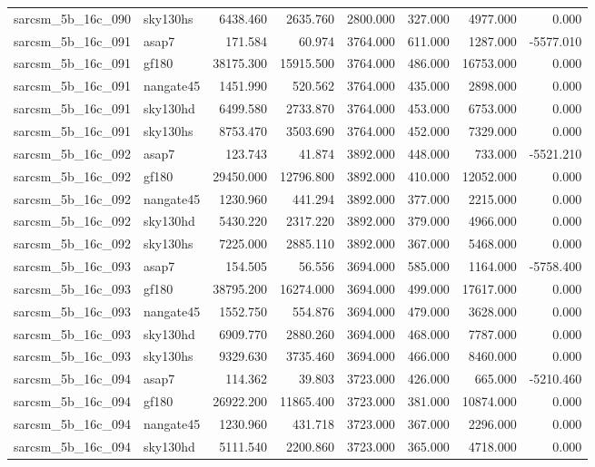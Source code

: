 \begin{tabular}{llrrrrrr}
sarcsm\_5b\_16c\_090 & sky130hs & 6438.460 & 2635.760 & 2800.000 & 327.000 & 4977.000 & 0.000 \\
sarcsm\_5b\_16c\_091 & asap7 & 171.584 & 60.974 & 3764.000 & 611.000 & 1287.000 & -5577.010 \\
sarcsm\_5b\_16c\_091 & gf180 & 38175.300 & 15915.500 & 3764.000 & 486.000 & 16753.000 & 0.000 \\
sarcsm\_5b\_16c\_091 & nangate45 & 1451.990 & 520.562 & 3764.000 & 435.000 & 2898.000 & 0.000 \\
sarcsm\_5b\_16c\_091 & sky130hd & 6499.580 & 2733.870 & 3764.000 & 453.000 & 6753.000 & 0.000 \\
sarcsm\_5b\_16c\_091 & sky130hs & 8753.470 & 3503.690 & 3764.000 & 452.000 & 7329.000 & 0.000 \\
sarcsm\_5b\_16c\_092 & asap7 & 123.743 & 41.874 & 3892.000 & 448.000 & 733.000 & -5521.210 \\
sarcsm\_5b\_16c\_092 & gf180 & 29450.000 & 12796.800 & 3892.000 & 410.000 & 12052.000 & 0.000 \\
sarcsm\_5b\_16c\_092 & nangate45 & 1230.960 & 441.294 & 3892.000 & 377.000 & 2215.000 & 0.000 \\
sarcsm\_5b\_16c\_092 & sky130hd & 5430.220 & 2317.220 & 3892.000 & 379.000 & 4966.000 & 0.000 \\
sarcsm\_5b\_16c\_092 & sky130hs & 7225.000 & 2885.110 & 3892.000 & 367.000 & 5468.000 & 0.000 \\
sarcsm\_5b\_16c\_093 & asap7 & 154.505 & 56.556 & 3694.000 & 585.000 & 1164.000 & -5758.400 \\
sarcsm\_5b\_16c\_093 & gf180 & 38795.200 & 16274.000 & 3694.000 & 499.000 & 17617.000 & 0.000 \\
sarcsm\_5b\_16c\_093 & nangate45 & 1552.750 & 554.876 & 3694.000 & 479.000 & 3628.000 & 0.000 \\
sarcsm\_5b\_16c\_093 & sky130hd & 6909.770 & 2880.260 & 3694.000 & 468.000 & 7787.000 & 0.000 \\
sarcsm\_5b\_16c\_093 & sky130hs & 9329.630 & 3735.460 & 3694.000 & 466.000 & 8460.000 & 0.000 \\
sarcsm\_5b\_16c\_094 & asap7 & 114.362 & 39.803 & 3723.000 & 426.000 & 665.000 & -5210.460 \\
sarcsm\_5b\_16c\_094 & gf180 & 26922.200 & 11865.400 & 3723.000 & 381.000 & 10874.000 & 0.000 \\
sarcsm\_5b\_16c\_094 & nangate45 & 1230.960 & 431.718 & 3723.000 & 367.000 & 2296.000 & 0.000 \\
sarcsm\_5b\_16c\_094 & sky130hd & 5111.540 & 2200.860 & 3723.000 & 365.000 & 4718.000 & 0.000 \\

\end{tabular}
